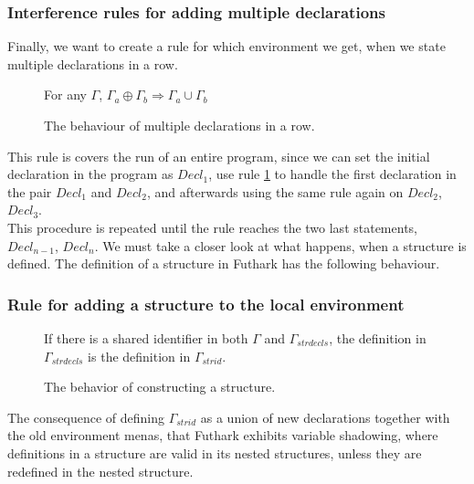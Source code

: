 \subsubsection{Interference rules for adding multiple declarations}
Finally, we want to create a rule for which environment we get, when we state
multiple declarations in a row.
\begin{figure}
  \begin{tcolorbox}
    \begin{prooftree}
      \end{prooftree}
      For any $\Gamma$, $\Gamma_a \oplus \Gamma_b \Rightarrow \Gamma_a \cup \Gamma_b$
    \end{tcolorbox}
  \caption{The behaviour of multiple declarations in a row. \label{RuleAddMultiple}}
\end{figure}
This rule is covers the run of an entire program, since we can set the initial
declaration in the program as $Decl_1$, use rule \ref{RuleAddMultiple} to handle
the first declaration in the pair $Decl_1$ and $Decl_2$, and afterwards using
the same rule again on $Decl_2$, $Decl_3$.
\\
This procedure is repeated until the rule reaches the two last statements,
$Decl_{n-1}$, $Decl_n$. 
We must take a closer look at what happens, when a structure is defined.
The definition of a structure in Futhark has the following behaviour.
\subsubsection{Rule for adding a structure to the local environment}
\begin{figure}
  \begin{tcolorbox}
    \begin{prooftree}
    \end{prooftree}
    If there is a shared identifier in both $\Gamma$ and $\Gamma_{strdecls}$,
    the definition in $\Gamma_{strdecls}$ is the definition in $\Gamma_{strid}$.
  \end{tcolorbox}
  \caption{The behavior of constructing a structure.\label{RuleAddStruct}}
\end{figure}
The consequence of defining $\Gamma_{strid}$ as a union of new declarations together with the old environment menas, that Futhark exhibits variable shadowing, where definitions in a structure are valid in its nested structures, unless they are redefined in the nested structure.

